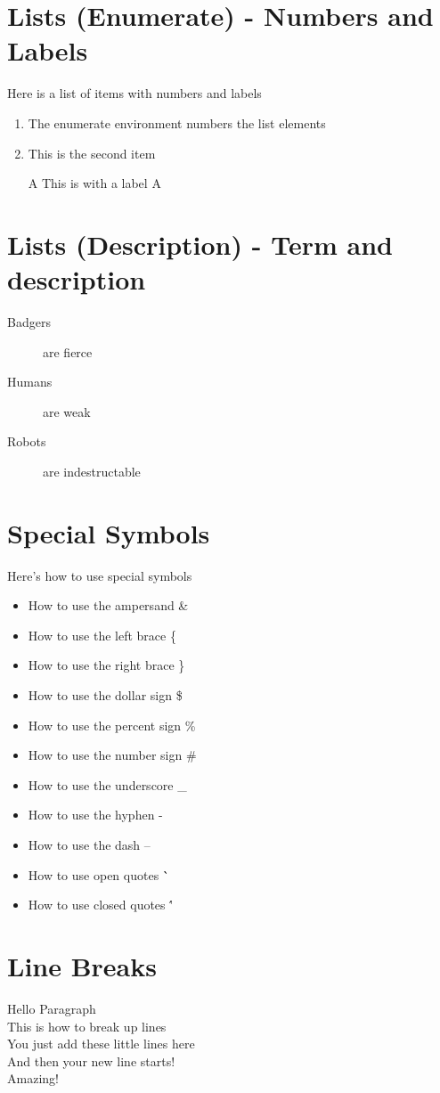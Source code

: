 \documentclass[11pt]{article}  %
\begin{document}
\section*{Lists (Enumerate) - Numbers and Labels}
Here is a list of items with numbers and labels
\begin{enumerate}  %
\item The enumerate environment numbers the list elements
\item This is the second item
\item[A] This is with a label A
\end{enumerate}

\section*{Lists (Description) - Term and description}
\begin{description}
\item[Badgers] are fierce
\item[Humans] are weak
\item[Robots] are indestructable
\end{description}

\section*{Special Symbols}
Here's how to use special symbols
\begin{itemize}
\item How to use the ampersand \&
\item How to use the left brace \{
\item How to use the right brace \}
\item How to use the dollar sign \$
\item How to use the percent sign \%
\item How to use the number sign \#
\item How to use the underscore \_
\item How to use the hyphen \--
\item How to use the dash \---
\item How to use open quotes \``
\item How to use closed quotes \''
\end{itemize}

\section*{Line Breaks}
\begin{paragraph} Hello Paragraph  \\
This is how to break up lines \\
You just add these little lines here \\
And then your new line starts! \\
Amazing!
\end{paragraph}
\end{document}
